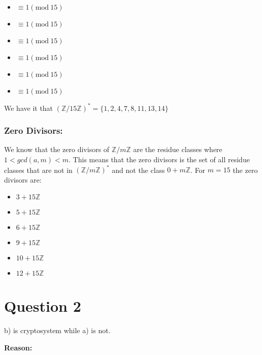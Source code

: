 \documentclass{article}
\numberwithin{equation}{subsection}
\begin{document}
	\begin{itemize}
		\item{}  $\equiv 1(\textrm{mod}\ 15)$	
		\item{}  $\equiv 1(\textrm{mod}\ 15)$	
		\item{}  $\equiv 1(\textrm{mod}\ 15)$	
		\item{}  $\equiv 1(\textrm{mod}\ 15)$	
		\item{}  $\equiv 1(\textrm{mod}\ 15)$	
		\item{}  $\equiv 1(\textrm{mod}\ 15)$	
	\end{itemize}

	\vspace{1pt}
	We have it that $(\mathbb{Z}/15\mathbb{Z})^* = \{1,2,4,7,8,11,13,14\}$
	
	\vspace{10pt}
	\subsubsection*{Zero Divisors:}
	We know that the zero divisors of $\mathbb{Z}/m\mathbb{Z}$ are the residue
	classes where $1<gcd(a,m)<m$. This means that the zero divisors is the set of all
	residue classes that are not in $(\mathbb{Z}/m\mathbb{Z})^*$ and not the class $0+m\mathbb{Z}$.
	For $m=15$ the zero divisors are:
	
	\begin{itemize}
		\item $3+15\mathbb{Z}$	
		\item $5+15\mathbb{Z}$	
		\item $6+15\mathbb{Z}$	
		\item $9+15\mathbb{Z}$	
		\item $10+15\mathbb{Z}$	
		\item $12+15\mathbb{Z}$	
	\end{itemize}

	\vspace{25pt}
	\section*{Question 2}
	b) is cryptosystem while a) is not.

	\vspace{10pt}
	\textbf{Reason:}
	
\end{document}

